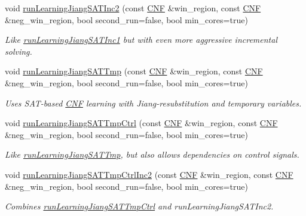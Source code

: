 \begin{DoxyCompactItemize}
void \hyperlink{classLearningImplExtractor_a2ee6e07a5c9907195c1af8cba613dbd1}{run\-Learning\-Jiang\-S\-A\-T\-Inc2} (const \hyperlink{classCNF}{C\-N\-F} \&win\-\_\-region, const \hyperlink{classCNF}{C\-N\-F} \&neg\-\_\-win\-\_\-region, bool second\-\_\-run=false, bool min\-\_\-cores=true)
\begin{DoxyCompactList}\small\item\em Like \hyperlink{classLearningImplExtractor_a036ab2a3921696d31fb55139427d2114}{run\-Learning\-Jiang\-S\-A\-T\-Inc1} but with even more aggressive incremental solving. \end{DoxyCompactList}\item 
void \hyperlink{classLearningImplExtractor_ad214c79ae2c0e56a47ad97ad2e5c3765}{run\-Learning\-Jiang\-S\-A\-T\-Tmp} (const \hyperlink{classCNF}{C\-N\-F} \&win\-\_\-region, const \hyperlink{classCNF}{C\-N\-F} \&neg\-\_\-win\-\_\-region, bool second\-\_\-run=false, bool min\-\_\-cores=true)
\begin{DoxyCompactList}\small\item\em Uses S\-A\-T-\/based \hyperlink{classCNF}{C\-N\-F} learning with Jiang-\/resubstitution and temporary variables. \end{DoxyCompactList}\item 
void \hyperlink{classLearningImplExtractor_ad41484b6bb6da18e50d31830a18e63e9}{run\-Learning\-Jiang\-S\-A\-T\-Tmp\-Ctrl} (const \hyperlink{classCNF}{C\-N\-F} \&win\-\_\-region, const \hyperlink{classCNF}{C\-N\-F} \&neg\-\_\-win\-\_\-region, bool second\-\_\-run=false, bool min\-\_\-cores=true)
\begin{DoxyCompactList}\small\item\em Like \hyperlink{classLearningImplExtractor_ad214c79ae2c0e56a47ad97ad2e5c3765}{run\-Learning\-Jiang\-S\-A\-T\-Tmp}, but also allows dependencies on control signals. \end{DoxyCompactList}\item 
void \hyperlink{classLearningImplExtractor_a5ce27f574afbb4504b7acd82196314d7}{run\-Learning\-Jiang\-S\-A\-T\-Tmp\-Ctrl\-Inc2} (const \hyperlink{classCNF}{C\-N\-F} \&win\-\_\-region, const \hyperlink{classCNF}{C\-N\-F} \&neg\-\_\-win\-\_\-region, bool second\-\_\-run=false, bool min\-\_\-cores=true)
\begin{DoxyCompactList}\small\item\em Combines \hyperlink{classLearningImplExtractor_ad41484b6bb6da18e50d31830a18e63e9}{run\-Learning\-Jiang\-S\-A\-T\-Tmp\-Ctrl} and run\-Learning\-Jiang\-S\-A\-T\-Inc2. \end{DoxyCompactList}\item 

\end{DoxyCompactItemize}

